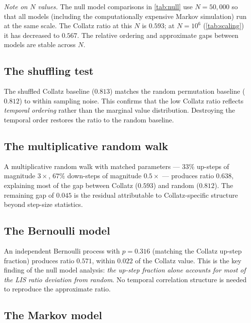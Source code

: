\documentclass[11pt]{article}
\theoremstyle{definition}
\theoremstyle{remark}
\begin{document}
\noindent
\emph{Note on $N$ values.} The null model comparisons in
\cref{tab:null} use $N = 50{,}000$ so that all models (including the
computationally expensive Markov simulation) run at the same scale.
The Collatz ratio at this $N$ is $0.593$; at $N = 10^6$
(\cref{tab:scaling}) it has decreased to $0.567$. The relative ordering
and approximate gaps between models are stable across $N$.

\subsection{The shuffling test}\label{sec:shuffle}

The shuffled Collatz baseline ($0.813$) matches the random permutation
baseline ($0.812$) to within sampling noise. This confirms that the low
Collatz ratio reflects \emph{temporal ordering} rather than the marginal
value distribution. Destroying the temporal order restores the ratio to the
random baseline.

\subsection{The multiplicative random walk}\label{sec:multrw}

A multiplicative random walk with matched parameters --- $33\%$ up-steps of
magnitude $3\times$, $67\%$ down-steps of magnitude $0.5\times$ --- produces
ratio $0.638$, explaining most of the gap between Collatz ($0.593$) and
random ($0.812$). The remaining gap of $0.045$ is the residual attributable
to Collatz-specific structure beyond step-size statistics.

\subsection{The Bernoulli model}\label{sec:bernoulli}

An independent Bernoulli process with $p = 0.316$ (matching the Collatz
up-step fraction) produces ratio $0.571$, within $0.022$ of the Collatz
value. This is the key finding of the null model analysis: \emph{the
up-step fraction alone accounts for most of the LIS ratio deviation from
random}. No temporal correlation structure is needed to reproduce the
approximate ratio.

\subsection{The Markov model}\label{sec:markov}
\end{document}
